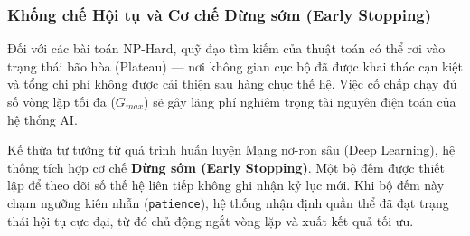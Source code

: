 \documentclass[12pt,a4paper]{article}
\numberwithin{figure}{subsection}
\begin{document}
\subsubsection{Khống chế Hội tụ và Cơ chế Dừng sớm (Early Stopping)}

Đối với các bài toán NP-Hard, quỹ đạo tìm kiếm của thuật toán có thể rơi vào trạng thái bão hòa (Plateau) — nơi không gian cục bộ đã được khai thác cạn kiệt và tổng chi phí không được cải thiện sau hàng chục thế hệ. Việc cố chấp chạy đủ số vòng lặp tối đa ($G_{max}$) sẽ gây lãng phí nghiêm trọng tài nguyên điện toán của hệ thống AI.

Kế thừa tư tưởng từ quá trình huấn luyện Mạng nơ-ron sâu (Deep Learning), hệ thống tích hợp cơ chế \textbf{Dừng sớm (Early Stopping)}. Một bộ đếm được thiết lập để theo dõi số thế hệ liên tiếp không ghi nhận kỷ lục mới. Khi bộ đếm này chạm ngưỡng kiên nhẫn (\texttt{patience}), hệ thống nhận định quần thể đã đạt trạng thái hội tụ cực đại, từ đó chủ động ngắt vòng lặp và xuất kết quả tối ưu.
\end{document}

